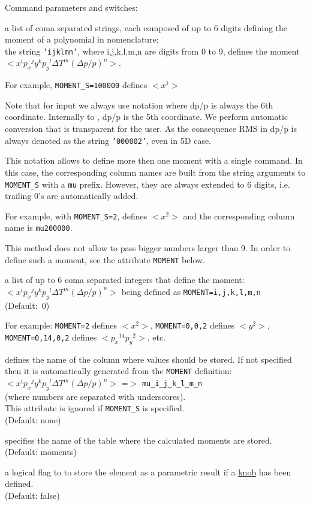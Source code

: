 Command parameters and switches:
\begin{madlist}
   a list of coma separated strings, each composed of
  up to 6 digits defining the moment of a polynomial in \ptc
  nomenclature: \\ the string \texttt{'ijklmn'}, where i,j,k,l,m,n are digits
  from 0 to 9, defines the moment $<x^i {p_x}^j y^k {p_y}^l \Delta T^m
  (\Delta p/p)^n>$.
  
  For example, \texttt{MOMENT\_S=100000} defines $<x^1>$ 
  
  Note that for input we always use \madx notation where dp/p is always
  the 6th coordinate. Internally to \ptc, dp/p is the 5th coordinate. We
  perform automatic conversion that is transparent for the user. As the
  consequence RMS in dp/p is always denoted as the string
  \texttt{'000002'}, even in 5D case.     
  
  This notation allows to define more then one moment with a single
  command. In this case, the corresponding column names are built from
  the string arguments to \texttt{MOMENT\_S} with a \texttt{mu} prefix. 
  However, they are always extended to 6 digits, i.e. trailing 0's are
  automatically added.

  For example, with \texttt{MOMENT\_S=2}, defines  $<x^2>$ and the
  corresponding column name is \texttt{mu200000}.
  
  This method does not allow to pass bigger numbers larger than 9. In
  order to define such a moment, see the attribute \texttt{MOMENT} below.    
  
   a list of up to 6 coma separated integers that define
  the moment: \\ 
  $<x^i {p_x}^j y^k {p_y}^l \Delta T^m (\Delta p/p)^n>$ being
  defined as \texttt{MOMENT=i,j,k,l,m,n}\\
  (Default:~0)
  
  For example: \texttt{MOMENT=2} defines $< x^2 >$, \texttt{MOMENT=0,0,2}
  defines  $< y^2 >$, \texttt{MOMENT=0,14,0,2} defines $<{p_x}^{14} {p_y}^2>$, 
  etc. 
  
   defines the name of the column where values should be
  stored. If not specified then it is automatically generated from
  the \texttt{MOMENT} definition:\\ 
  $< x^i {p_x}^j y^k {p_y}^l \Delta T^m (\Delta p/p)^n>$ =$>$ \texttt{mu\_i\_j\_k\_l\_m\_n} \\
  (where numbers are separated with underscores). \\
  This attribute is ignored if \texttt{MOMENT\_S} is specified. \\
  (Default: none)

   specifies the name of the table where the calculated
  moments are stored. \\
  (Default: moments)

   a logical flag to to store the element as a
  parametric result if a \hyperref[sec:ptc-knob]{knob} has been
  defined. \\
  (Default: false)
\end{madlist} 

